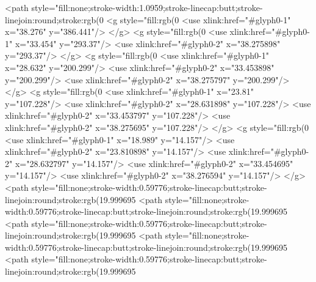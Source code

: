 <path style="fill:none;stroke-width:1.0959;stroke-linecap:butt;stroke-linejoin:round;stroke:rgb(0%
<g style="fill:rgb(0%
  <use xlink:href="#glyph0-1" x="38.276" y="386.441"/>
</g>
<g style="fill:rgb(0%
  <use xlink:href="#glyph0-1" x="33.454" y="293.37"/>
  <use xlink:href="#glyph0-2" x="38.275898" y="293.37"/>
</g>
<g style="fill:rgb(0%
  <use xlink:href="#glyph0-1" x="28.632" y="200.299"/>
  <use xlink:href="#glyph0-2" x="33.453898" y="200.299"/>
  <use xlink:href="#glyph0-2" x="38.275797" y="200.299"/>
</g>
<g style="fill:rgb(0%
  <use xlink:href="#glyph0-1" x="23.81" y="107.228"/>
  <use xlink:href="#glyph0-2" x="28.631898" y="107.228"/>
  <use xlink:href="#glyph0-2" x="33.453797" y="107.228"/>
  <use xlink:href="#glyph0-2" x="38.275695" y="107.228"/>
</g>
<g style="fill:rgb(0%
  <use xlink:href="#glyph0-1" x="18.989" y="14.157"/>
  <use xlink:href="#glyph0-2" x="23.810898" y="14.157"/>
  <use xlink:href="#glyph0-2" x="28.632797" y="14.157"/>
  <use xlink:href="#glyph0-2" x="33.454695" y="14.157"/>
  <use xlink:href="#glyph0-2" x="38.276594" y="14.157"/>
</g>
<path style="fill:none;stroke-width:0.59776;stroke-linecap:butt;stroke-linejoin:round;stroke:rgb(19.999695%
<path style="fill:none;stroke-width:0.59776;stroke-linecap:butt;stroke-linejoin:round;stroke:rgb(19.999695%
<path style="fill:none;stroke-width:0.59776;stroke-linecap:butt;stroke-linejoin:round;stroke:rgb(19.999695%
<path style="fill:none;stroke-width:0.59776;stroke-linecap:butt;stroke-linejoin:round;stroke:rgb(19.999695%
<path style="fill:none;stroke-width:0.59776;stroke-linecap:butt;stroke-linejoin:round;stroke:rgb(19.999695%
